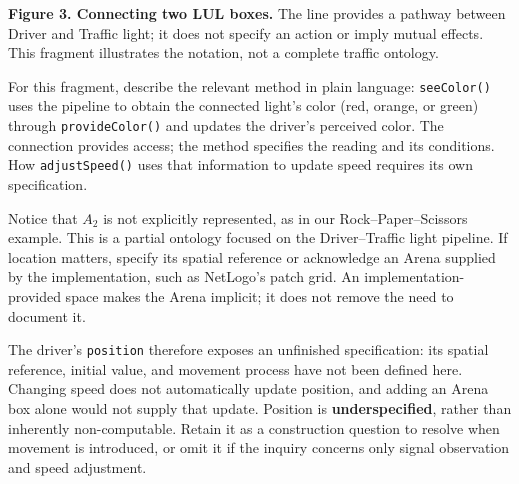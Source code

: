 \documentclass[11pt,a4paper]{article}
\newcommand{\stereo}[1]{\texttt{\guillemotleft #1\guillemotright}}
\begin{document}
\begin{center}
\end{center}
{\small\textbf{Figure 3. Connecting two LUL boxes.} The line provides a pathway between Driver and Traffic light; it does not specify an action or imply mutual effects. This fragment illustrates the notation, not a complete traffic ontology.}

For this fragment, describe the relevant method in plain language: \texttt{seeColor()} uses the pipeline to obtain the connected light's color (red, orange, or green) through \texttt{provideColor()} and updates the driver's perceived color. The connection provides access; the method specifies the reading and its conditions. How \texttt{adjustSpeed()} uses that information to update speed requires its own specification.

Notice that $A_2$ is not explicitly represented, as in our Rock--Paper--Scissors example. This is a partial ontology focused on the Driver--Traffic light pipeline. If location matters, specify its spatial reference or acknowledge an Arena supplied by the implementation, such as NetLogo's patch grid. An implementation-provided space makes the Arena implicit; it does not remove the need to document it.

The driver's \texttt{position} therefore exposes an unfinished specification: its spatial reference, initial value, and movement process have not been defined here. Changing speed does not automatically update position, and adding an Arena box alone would not supply that update. Position is \textbf{underspecified}, rather than inherently non-computable. Retain it as a construction question to resolve when movement is introduced, or omit it if the inquiry concerns only signal observation and speed adjustment.
\end{document}

